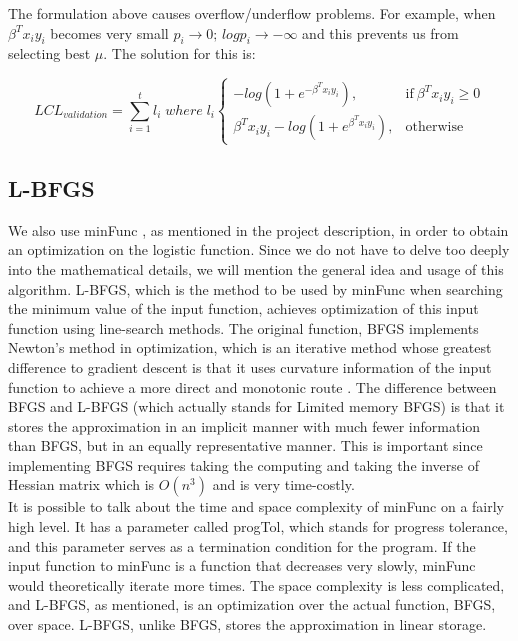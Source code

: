 \documentclass[a4paper]{article}
\begin{document}
The formulation above causes overflow/underflow problems. For example, when $\beta^{T}x_i y_i$ becomes very small $p_i \rightarrow 0;\, logp_i \rightarrow -\infty$ and this prevents us from selecting best $\mu$. The solution for this is:

\begin{equation*}
LCL_{validation} = \sum_{i=1}^{t}l_i\; where\; l_i 
\begin{cases}
-log(1+e^{-\beta^T x_i y_i}), & \text{if}\ \beta^T x_i y_i \ge 0 \\
\beta^T x_i y_i - log(1+e^{\beta^T x_i y_i}), & \text{otherwise}
\end{cases}
\end{equation*}

\subsection{L-BFGS}

We also use minFunc \cite{Label3}, as mentioned in the project description, in order to obtain an optimization on the logistic function. Since we do not have to delve too deeply into the mathematical details, we will mention the general idea and usage of this algorithm. L-BFGS, which is the method to be used by minFunc when searching the minimum value of the input function, achieves optimization of this input function using line-search methods. The original function, BFGS implements Newton's method in optimization, which is an iterative method whose greatest difference to gradient descent is that it uses curvature information of the input function to achieve a more direct and monotonic route \cite{Label6}. The difference between BFGS and L-BFGS (which actually stands for Limited memory BFGS) is that it stores the approximation in an implicit manner with much fewer information than BFGS, but in an equally representative manner. This is important since implementing BFGS requires taking the computing and taking the inverse of Hessian matrix which is $O(n^3)$ and is very time-costly. \\

It is possible to talk about the time and space complexity of minFunc on a fairly high level. It has a parameter called progTol, which stands for progress tolerance, and this parameter serves as a termination condition for the program. If the input function to minFunc is a function that decreases very slowly, minFunc would theoretically iterate more times. The space complexity is less complicated, and L-BFGS, as mentioned, is an optimization over the actual function, BFGS, over space. L-BFGS, unlike BFGS, stores the approximation in linear storage.
\end{document}
